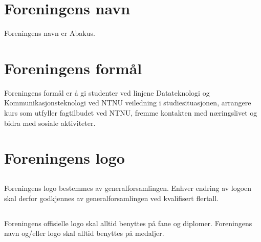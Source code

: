 \section{Foreningens navn}
Foreningens navn er Abakus.

\section{Foreningens formål}
Foreningens formål er å gi studenter ved linjene Datateknologi og
Kommunikasjonsteknologi ved NTNU veiledning i studiesituasjonen, arrangere
kurs som utfyller fagtilbudet ved NTNU, fremme kontakten med næringslivet og
bidra med sosiale aktiviteter.

\section{Foreningens logo}

\subsection{}
Foreningens logo bestemmes av generalforsamlingen. Enhver endring av logoen
skal derfor godkjennes av generalforsamlingen ved kvalifisert flertall.

\subsection{}
Foreningens offisielle logo skal alltid benyttes på fane og diplomer.
Foreningens navn og/eller logo skal alltid benyttes på medaljer. 

